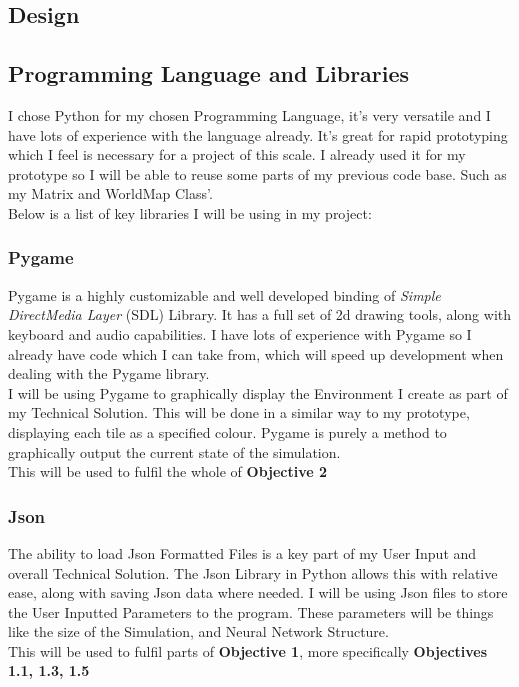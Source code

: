 \begin{flushleft}
    \large
    \section{Design}
        \subsection{Programming Language and Libraries}
            I chose Python for my chosen Programming Language, it's very versatile and I have lots of experience with the language
            already. It's great for rapid prototyping which I feel is necessary for a project of this scale. I already used it for 
            my prototype so I will be able to reuse some parts of my previous code base. Such as my Matrix and WorldMap Class'. \\
            \vspace{0.2cm}
            Below is a list of key libraries I will be using in my project: \\

            \subsubsection*{Pygame}
            Pygame is a highly customizable and well developed binding of \textit{Simple DirectMedia Layer} (SDL) Library. 
            It has a full set of 2d drawing tools, along with keyboard and audio capabilities. I have lots of experience with Pygame 
            so I already have code which I can take from, which will speed up development when dealing with the Pygame library. \\
            \vspace{0.2cm}
            I will be using Pygame to graphically display the Environment I create as part of my Technical Solution. This
            will be done in a similar way to my prototype, displaying each tile as a specified colour. Pygame is purely a 
            method to graphically output the current state of the simulation. \\
            \vspace{0.2cm}
            This will be used to fulfil the whole of \textbf{Objective 2} \\

            \subsubsection*{Json}
            The ability to load Json Formatted Files is a key part of my User Input and overall Technical Solution. The Json 
            Library in Python allows this with relative ease, along with saving Json data where needed. I will be using Json files
            to store the User Inputted Parameters to the program. These parameters will be things like the size of the Simulation, and 
            Neural Network Structure. \\
            \vspace{0.2cm}
            This will be used to fulfil parts of \textbf{Objective 1}, more specifically \textbf{Objectives 1.1, 1.3, 1.5} \\


\end{flushleft}
